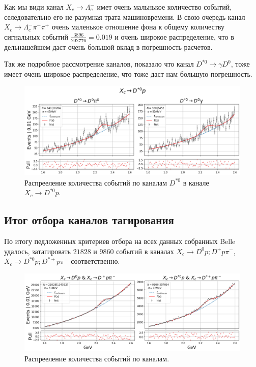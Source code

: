Как мы види канал $X_c \to \Lambda_c^-$ имет очень мальнькое количество событий, 
селедовательно его не разумная трата машиновремени. 
В свою очередь канал $X_c \to \Lambda_c^- \pi^- \pi^+$ очень маленькое отношение 
фона к общему количеству сигнальных событий $\frac{3896}{202776}=0.019$ и очень 
широкое распределение, что в дельнашейшем даст очень большой вклад в погрешность 
расчетов.  

Так же подробное рассмотрение каналов, показало что канал $D^{*0} \to \gamma D^0$, 
тоже имеет очень широкое распределение, что тоже даст нам большую погрешность.

\begin{figure}[H]
    \centering
    \includegraphics[width=1\linewidth]{img/gamm_pi.png}
    \caption{Распрееление количества событий по каналам $D^{*0}$ в канале $X_c \to D^{*0} p$.}
\end{figure}


\subsection{Итог отбора каналов тагирования}

По итогу педложенных критериев отбора на всех данных собранных Belle удалось, затагировать 
$21828$ и $9860$ событий в каналах $X_c \to D^0 p; D^+ p \pi^-$,  $X_c \to D^{*0} p; D^{*+} p \pi^-$ 
соответственно.

\begin{figure}[H]
    \centering
    \includegraphics[width=1\linewidth]{img/tag_sum.png}
    \caption{Распрееление количества событий по каналам.}
\end{figure}
